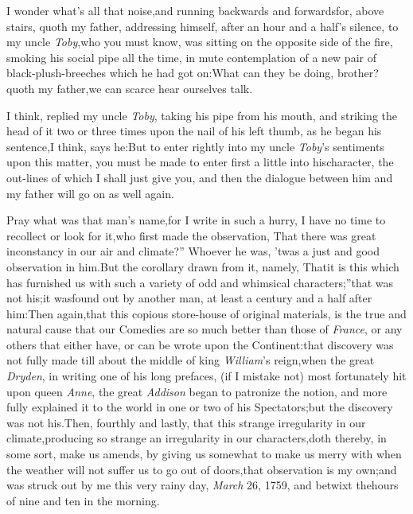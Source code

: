 \documentclass{article}
\begin{document}
\quad\tsh  I wonder what’s
all that noise,\break and running backwards and forwards\break for, above
stairs, quoth my father, addressing himself, after an hour and a\break
half’s silence, to my uncle \textit{Toby},\tsh  who
you must know, was sitting on the opposite side of the fire,
smoking his social pipe all the time, in mute contemplation of a
new pair of black-plush-breeches\break
which he had got on:\tsk  What
can they be doing, brother?  quoth my father,\tsk\break  we can
scarce hear ourselves talk.

I think, replied my uncle \textit{Toby}, taking his pipe from his
mouth, and striking the head of it two or three times upon the nail
of his left thumb, as he began his sentence,\tsh  I think,
says he:\tsh\break  But to enter rightly into my uncle
\textit{Toby}’s sentiments upon this matter, you must be made
to enter first a little into his\break character, the out-lines of which
I shall just give you, and then the dialogue between
him and my father will go on as well again.

\tsk Pray what was that man’s name,\tsk\break  for I write in such a
hurry, I have no time to recollect or look for it,\tsh  who
first made the observation, \lqq That there was great
inconstancy in our air and climate?” Whoever he was,
’twas a just and good observation in him.\tsk  But the
corollary drawn from it, namely, \lqq That\break it is this which
has furnished us with such a variety of odd and whimsical
characters;”\tsk  that was not his;\tsk  it was\break found out
by another man, at least a century and a half after him:\tsk Then\break
again,\tsk  that this copious store-house of original materials,
is the true and natural cause that our Comedies are so much better
than those of \textit{France}, or any others that either have, or can
be wrote upon the Continent:\tsh  that discovery was not
fully made till about the middle of king \textit{William}’s
reign,\tsk  when the great \textit{Dryden}, in writing one of his
long prefaces, (if I mistake not) most fortunately hit upon\break
{}
queen \textit{Anne}, the great \textit{Addison} began to
patronize the notion, and more fully explained it to the world in
one or two of his Spectators;\tsk  but the discovery was not
his.\tsk  Then, fourthly and lastly, that this strange
irregularity in our climate,\break producing so strange an irregularity
in our characters,\tsh  doth thereby, in some sort, make us
amends, by giving us somewhat to make us merry with when the
weather will not suffer us to go out of doors,\tsk  that
observation is my own;\tsk\break  and was struck out by me this very
rainy day, \textit{March} 26, 1759, and betwixt the\break hours of nine and
ten in the morning.
\end{document}
